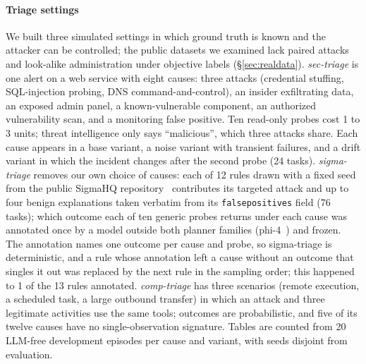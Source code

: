 \paragraph{Triage settings} We built three simulated settings in which ground truth is known and the attacker can be controlled; the public datasets we examined lack paired attacks and look-alike administration under objective labels (\S\ref{sec:realdata}). \emph{sec-triage} is one alert on a web service with eight causes: three attacks (credential stuffing, SQL-injection probing, DNS command-and-control), an insider exfiltrating data, an exposed admin panel, a known-vulnerable component, an authorized vulnerability scan, and a monitoring false positive. Ten read-only probes cost 1 to 3 units; threat intelligence only says ``malicious'', which three attacks share. Each cause appears in a base variant, a noise variant with transient failures, and a drift variant in which the incident changes after the second probe (24 tasks). \emph{sigma-triage} removes our own choice of causes: each of 12 rules drawn with a fixed seed from the public SigmaHQ repository~\citep{sigmahq} contributes its targeted attack and up to four benign explanations taken verbatim from its \texttt{falsepositives} field (76 tasks); which outcome each of ten generic probes returns under each cause was annotated once by a model outside both planner families (phi-4~\citep{phi4}) and frozen. The annotation names one outcome per cause and probe, so sigma-triage is deterministic, and a rule whose annotation left a cause without an outcome that singles it out was replaced by the next rule in the sampling order; this happened to 1 of the 13 rules annotated. \emph{comp-triage} has three scenarios (remote execution, a scheduled task, a large outbound transfer) in which an attack and three legitimate activities use the same tools; outcomes are probabilistic, and five of its twelve causes have no single-observation signature. Tables are counted from 20 LLM-free development episodes per cause and variant, with seeds disjoint from evaluation.

